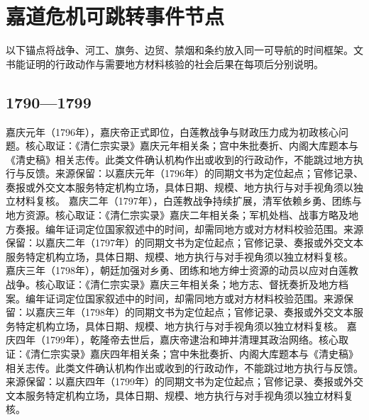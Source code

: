 \section{嘉道危机可跳转事件节点}
以下锚点将战争、河工、旗务、边贸、禁烟和条约放入同一可导航的时间框架。文书能证明的行政动作与需要地方材料核验的社会后果在每项后分别说明。
\subsection{1790—1799}
嘉庆元年（1796年），嘉庆帝正式即位，白莲教战争与财政压力成为初政核心问题。核心取证：《清仁宗实录》嘉庆元年相关条；宫中朱批奏折、内阁大库题本与《清史稿》相关志传。此类文件确认机构作出或收到的行政动作，不能跳过地方执行与反馈。来源保留：以嘉庆元年（1796年）的同期文书为定位起点；官修记录、奏报或外交文本服务特定机构立场，具体日期、规模、地方执行与对手视角须以独立材料复核。
嘉庆二年（1797年），白莲教战争持续扩展，清军依赖乡勇、团练与地方资源。核心取证：《清仁宗实录》嘉庆二年相关条；军机处档、战事方略及地方奏报。编年证词定位国家叙述中的时间，却需同地方或对方材料校验范围。来源保留：以嘉庆二年（1797年）的同期文书为定位起点；官修记录、奏报或外交文本服务特定机构立场，具体日期、规模、地方执行与对手视角须以独立材料复核。
嘉庆三年（1798年），朝廷加强对乡勇、团练和地方绅士资源的动员以应对白莲教战争。核心取证：《清仁宗实录》嘉庆三年相关条；地方志、督抚奏折及地方档案。编年证词定位国家叙述中的时间，却需同地方或对方材料校验范围。来源保留：以嘉庆三年（1798年）的同期文书为定位起点；官修记录、奏报或外交文本服务特定机构立场，具体日期、规模、地方执行与对手视角须以独立材料复核。
嘉庆四年（1799年），乾隆帝去世后，嘉庆帝逮治和珅并清理其政治网络。核心取证：《清仁宗实录》嘉庆四年相关条；宫中朱批奏折、内阁大库题本与《清史稿》相关志传。此类文件确认机构作出或收到的行政动作，不能跳过地方执行与反馈。来源保留：以嘉庆四年（1799年）的同期文书为定位起点；官修记录、奏报或外交文本服务特定机构立场，具体日期、规模、地方执行与对手视角须以独立材料复核。
